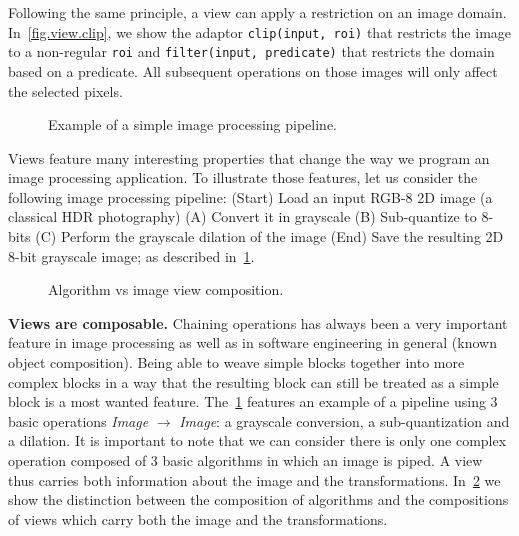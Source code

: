 Following the same principle, a view can apply a restriction on an image domain. In~\cref{fig.view.clip}, we show the
adaptor \texttt{clip(input, roi)} that restricts the image to a non-regular \texttt{roi} and \texttt{filter(input,
  predicate)} that restricts the domain based on a predicate. All subsequent operations on those images will only affect
the selected pixels.

\begin{figure}[tbh]
  
  \caption{Example of a simple image processing pipeline.}
  \label{fig.view.pipeline}
\end{figure}

Views feature many interesting properties that change the way we program an image processing application. To illustrate
those features, let us consider the following image processing pipeline: (Start) Load an input RGB-8 2D image (a
classical HDR photography) (A) Convert it in grayscale (B) Sub-quantize to 8-bits (C) Perform the grayscale dilation of
the image (End) Save the resulting 2D 8-bit grayscale image; as described in~\cref{fig.view.pipeline}.


\begin{figure}[tbh]
  \begin{minipage}{\linewidth}
    
  \end{minipage}
  \caption{Algorithm vs image view composition.}
  \label{fig.view.comp}
\end{figure}

\textbf{Views are composable.} Chaining operations has always been a very important feature in image processing as well
as in software engineering in general (known object composition). Being able to weave simple blocks together into more
complex blocks in a way that the resulting block can still be treated as a simple block is a most wanted feature.
The~\cref{fig.view.pipeline} features an example of a pipeline using 3 basic operations \emph{Image} $\rightarrow$
\emph{Image}: a grayscale conversion, a sub-quantization and a dilation. It is important to note that we can consider
there is only one complex operation composed of 3 basic algorithms in which an image is piped. A view thus carries both
information about the image and the transformations. In~\cref{fig.view.comp} we show the distinction between the
composition of algorithms and the compositions of views which carry both the image and the transformations.

